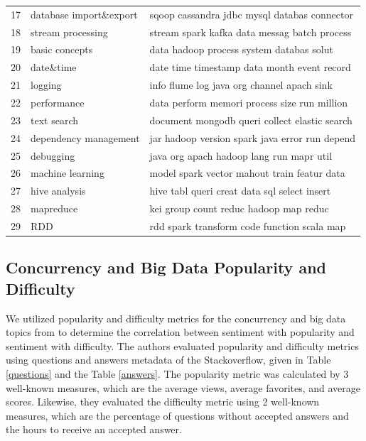 \begin{table}[tbp]
\begin{tabular}{p{.15in}p{2.25in}p{3.1in}}
17&database import\&export& 
sqoop cassandra jdbc mysql databas connector\\ 

18&stream processing& 
stream spark kafka data messag batch process\\ 

19&basic concepts& 
data hadoop process system databas solut\\ 

20&date\&time& 
date time timestamp data month event record\\ 

21&logging& 
info flume log java org channel apach sink\\ 

22&performance& 
data perform memori process size run million\\ 

23&text search& 
document mongodb queri collect elastic search\\ 

24&dependency management& 
jar hadoop version spark java error run depend\\ 

25&debugging& 
java org apach hadoop lang run mapr util\\ 

26&machine learning& 
model spark vector mahout train featur data\\ 

27&hive analysis& 
hive tabl queri creat data sql select insert\\ 

28&mapreduce& 
kei group count reduc hadoop map reduc\\ 

29&RDD& 
rdd spark transform code function scala map\\ \hline
\end{tabular}
\end{table}

\clearpage
\subsection{Concurrency and Big Data Popularity and Difficulty}
We utilized popularity and difficulty metrics for the concurrency and big data topics from \cite{ahmed2018concurrency, bagherzadeh2019going} to determine the correlation between sentiment with popularity and sentiment with difficulty. The authors evaluated popularity and difficulty metrics using questions and answers metadata of the Stackoverflow, given in Table \ref{questions} and the Table \ref{answers}. The popularity metric was calculated by 3 well-known measures, which are the average views, average favorites, and average scores. Likewise, they evaluated the difficulty metric using 2 well-known measures, which are the percentage of questions without accepted answers and the hours to receive an accepted answer.

